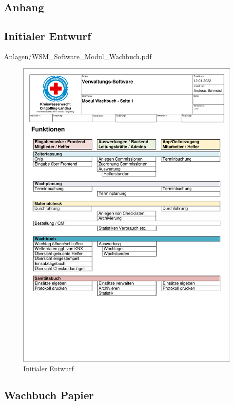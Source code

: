 \documentclass[fontsize=12pt,openright,oneside,paper=a4,BCOR=1cm]{scrbook}
\begin{document}
\begin{appendix}
\chapter{Anhang}
\section{Initialer Entwurf}


    {Anlagen/WSM_Software_Modul_Wachbuch.pdf}
\begin{figure}[H]
\centering
    \includegraphics[page=3,scale=0.75]{Anlagen/WSM_Software_Modul_Wachbuch.pdf}
  \caption{Initialer Entwurf}
  \label{fig:initial}
\end{figure}

\section{Wachbuch Papier}


\end{appendix}
\end{document}
